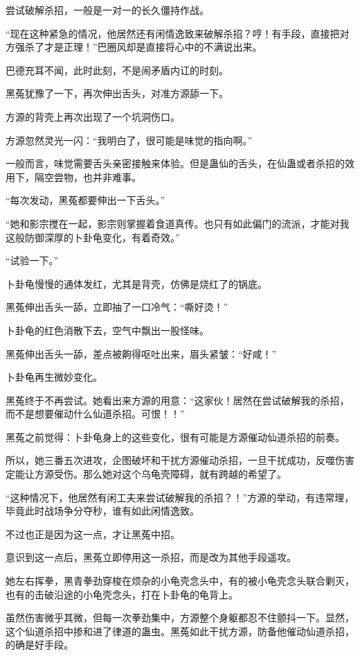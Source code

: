 \begin{this_body}
尝试破解杀招，一般是一对一的长久僵持作战。

“现在这种紧急的情况，他居然还有闲情逸致来破解杀招？哼！有手段，直接把对方强杀了才是正理！”巴圈风却是直接将心中的不满说出来。

巴德充耳不闻，此时此刻，不是闹矛盾内讧的时刻。

黑菟犹豫了一下，再次伸出舌头，对准方源舔一下。

方源的背壳上再次出现了一个坑洞伤口。

方源忽然灵光一闪：“我明白了，很可能是味觉的指向啊。”

一般而言，味觉需要舌头亲密接触来体验。但是蛊仙的舌头，在仙蛊或者杀招的效用下，隔空尝物，也并非难事。

“每次发动，黑菟都要伸出一下舌头。”

“她和影宗搅在一起，影宗则掌握着食道真传。也只有如此偏门的流派，才能对我这般防御深厚的卜卦龟变化，有着奇效。”

“试验一下。”

卜卦龟慢慢的通体发红，尤其是背壳，仿佛是烧红了的锅底。

黑菟伸出舌头一舔，立即抽了一口冷气：“嘶好烫！”

卜卦龟的红色消散下去，空气中飘出一股怪味。

黑菟伸出舌头一舔，差点被齁得呕吐出来，眉头紧皱：“好咸！”

卜卦龟再生微妙变化。

黑菟终于不再尝试。她看出来方源的用意：“这家伙！居然在尝试破解我的杀招，而不是想要催动什么仙道杀招。可恨！！”

黑菟之前觉得：卜卦龟身上的这些变化，很有可能是方源催动仙道杀招的前奏。

所以，她三番五次进攻，企图破坏和干扰方源催动杀招，一旦干扰成功，反噬伤害定能让方源受伤。那么她对这个乌龟壳障碍，就有跨越的希望了。

“这种情况下，他居然有闲工夫来尝试破解我的杀招？！”方源的举动，有违常理，毕竟此时战场争分夺秒，谁有如此闲情逸致。

不过也正是因为这一点，才让黑菟中招。

意识到这一点后，黑菟立即停用这一杀招，而是改为其他手段遥攻。

她左右挥拳，黑青拳劲穿梭在烦杂的小龟壳念头中，有的被小龟壳念头联合剿灭，也有的击破沿途的小龟壳念头，打在卜卦龟的龟背上。

虽然伤害微乎其微，但每一次拳劲集中，方源整个身躯都忍不住颤抖一下。显然，这个仙道杀招中掺和进了律道的蛊虫。黑菟如此干扰方源，防备他催动仙道杀招，的确是好手段。


\end{this_body}
